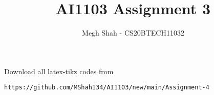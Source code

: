 \documentclass[journal,12pt,twocolumn]{IEEEtran}
\DeclareMathOperator*{\Res}{Res}
\begin{document}
\newcommand{\BEQA}{\begin{eqnarray}}
\newcommand{\EEQA}{\end{eqnarray}}
\newcommand{\define}{\stackrel{\triangle}{=}}

\raggedbottom
\setlength{\parindent}{0pt}
\providecommand{\mbf}{\mathbf}
\providecommand{\pr}[1]{\ensuremath{\Pr\left(#1\right)}}
\providecommand{\qfunc}[1]{\ensuremath{Q\left(#1\right)}}
\providecommand{\sbrak}[1]{\ensuremath{{}\left[#1\right]}}
\providecommand{\lsbrak}[1]{\ensuremath{{}\left[#1\right.}}
\providecommand{\rsbrak}[1]{\ensuremath{{}\left.#1\right]}}
\providecommand{\brak}[1]{\ensuremath{\left(#1\right)}}
\providecommand{\lbrak}[1]{\ensuremath{\left(#1\right.}}
\providecommand{\rbrak}[1]{\ensuremath{\left.#1\right)}}
\providecommand{\cbrak}[1]{\ensuremath{\left\{#1\right\}}}
\providecommand{\lcbrak}[1]{\ensuremath{\left\{#1\right.}}
\providecommand{\rcbrak}[1]{\ensuremath{\left.#1\right\}}}
\theoremstyle{remark}
\newtheorem{rem}{Remark}
\newcommand{\sgn}{\mathop{\mathrm{sgn}}}
\providecommand{\abs}[1]{\vert#1\vert}
\providecommand{\res}[1]{\Res\displaylimits_{#1}} 
\providecommand{\norm}[1]{\lVert#1\rVert}
\providecommand{\mtx}[1]{\mathbf{#1}}
\providecommand{\mean}[1]{E[ #1 ]}
\providecommand{\fourier}{\overset{\mathcal{F}}{ \rightleftharpoons}}
\providecommand{\system}{\overset{\mathcal{H}}{ \longleftrightarrow}}
\newcommand{\solution}{\noindent \textbf{Solution: }}
\newcommand{\cosec}{\,\text{cosec}\,}
\providecommand{\dec}[2]{\ensuremath{\overset{#1}{\underset{#2}{\gtrless}}}}
\newcommand{\myvec}[1]{\ensuremath{\begin{pmatrix}#1\end{pmatrix}}}
\newcommand{\mydet}[1]{\ensuremath{\begin{vmatrix}#1\end{vmatrix}}}
\makeatletter
{}
\makeatother
\let\StandardTheFigure\thefigure
\let\vec\mathbf
\renewcommand{\thefigure}{\theproblem}
\def\putbox#1#2#3{\makebox[0in][l]{\makebox[#1][l]{}\raisebox{\baselineskip}[0in][0in]{\raisebox{#2}[0in][0in]{#3}}}}
     \def\rightbox#1{\makebox[0in][r]{#1}}
     \def\centbox#1{\makebox[0in]{#1}}
     \def\topbox#1{\raisebox{-\baselineskip}[0in][0in]{#1}}
     \def\midbox#1{\raisebox{-0.5\baselineskip}[0in][0in]{#1}}
\vspace{3cm}
\title{AI1103 Assignment 3}
\author{Megh Shah - CS20BTECH11032}
\maketitle
\newpage
\bigskip
\renewcommand{\thefigure}{\theenumi}
\renewcommand{\thetable}{\theenumi}
Download all latex-tikz codes from 
%
\begin{lstlisting}
https://github.com/MShah134/AI1103/new/main/Assignment-4
\end{lstlisting}
\end{document}
